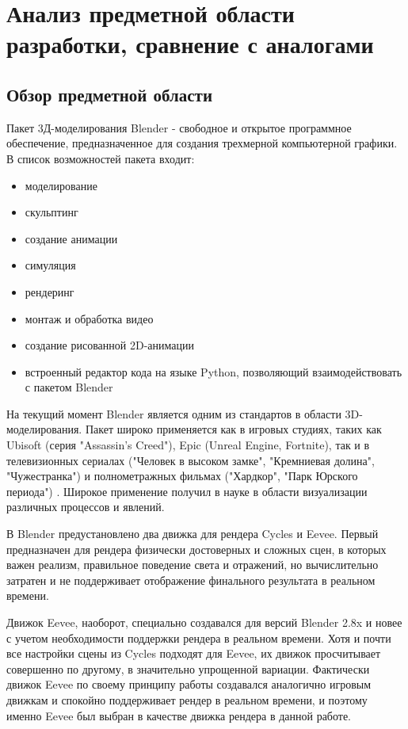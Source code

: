 \section{Анализ предметной области разработки, сравнение с аналогами}

\subsection{Обзор предметной области}
Пакет 3Д-моделирования Blender - свободное и открытое программное обеспечение, предназначенное для создания трехмерной компьютерной графики. В список возможностей пакета входит:
\begin{itemize}
	\item моделирование
	\item скульптинг
	\item создание анимации
	\item симуляция
	\item рендеринг
	\item монтаж и обработка видео
	\item создание рисованной 2D-анимации
	\item встроенный редактор кода на языке Python, позволяющий взаимодействовать с пакетом Blender
\end{itemize}

На текущий момент Blender является одним из стандартов в области 3D-моделирования. Пакет широко применяется как в игровых студиях, таких как Ubisoft (серия "Assassin's Creed"), Epic (Unreal Engine, Fortnite), так и в телевизионных сериалах ("Человек в высоком замке", "Кремниевая долина", "Чужестранка") и полнометражных фильмах ("Хардкор", "Парк Юрского периода") \cite{guru-ytb}. Широкое применение получил в науке в области визуализации различных процессов и явлений.

В Blender предустановлено два движка для рендера Cycles и Eevee. Первый предназначен для рендера физически достоверных и сложных сцен, в которых важен реализм, правильное поведение света и отражений, но вычислительно затратен и не поддерживает отображение финального результата в реальном времени.

Движок Eevee, наоборот, специально создавался для версий Blender 2.8x и новее с учетом необходимости поддержки рендера в реальном времени. Хотя и почти все настройки сцены из Cycles подходят для Eevee, их движок просчитывает совершенно по другому, в значительно упрощенной вариации. Фактически движок Eevee по своему принципу работы создавался аналогично игровым движкам и спокойно поддерживает рендер в реальном времени, и поэтому именно Eevee был выбран в качестве движка рендера в данной работе.

